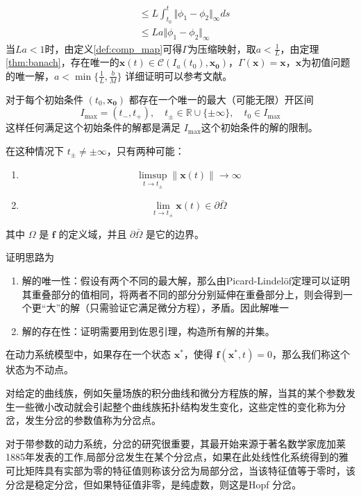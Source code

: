 \begin{pf}
\begin{equation*}
\begin{aligned}
                                                             & \leq L\int_{t_0}^t\Vert \phi_1-\phi_2\Vert_{\infty} ds                             \\
                                                             & \leq La\Vert \phi_1-\phi_2\Vert_{\infty}
        \end{aligned}
    \end{equation*}
    当$La<1$时，由定义\ref{def:comp_map}可得$\Gamma$为压缩映射，取$a<\frac{1}{L}$，由定理\ref{thm:banach}，存在唯一的$\mathbf{x}(t)\in \mathcal{C}(I_a(t_0),\mathbf{x_0})$，$\Gamma(\mathbf{x})=\mathbf{x}$，$\mathbf{x}$为初值问题的唯一解，$a<\min\{\frac{1}{L},\frac{b}{M}\}$
    详细证明可以参考文献\cite{murray2013existence}。
\end{pf}
\begin{rem}\label{rem:P-L}
    对于每个初始条件 $(t_0, \mathbf{x_0})$ 都存在一个唯一的最大（可能无限）开区间
    $$I_{\text{max}} = (t_{-}, t_{+}), \quad t_{\pm} \in \mathbb{R} \cup \{\pm \infty\}, \quad t_0 \in I_{\text{max}}$$
    这样任何满足这个初始条件的解都是满足 $I_{\text{max}}$这个初始条件的解的限制。

    在这种情况下 $t_{\pm} \neq \pm \infty$，只有两种可能：
    \begin{enumerate}
        \item $$\limsup_{t \to t_{\pm}} \|\mathbf{x}(t)\| \to \infty$$
        \item $$\lim_{t \to t_{\pm}} \mathbf{x}(t) \in \partial \bar{\Omega}$$
    \end{enumerate}
    其中 $\Omega$ 是 $\mathbf{f}$ 的定义域，并且 $\partial \bar{\Omega}$ 是它的边界。
\end{rem}
\begin{pf}
    证明思路为\begin{enumerate}
        \item 解的唯一性：假设有两个不同的最大解，那么由Picard-Lindelöf定理可以证明其重叠部分的值相同，将两者不同的部分分别延伸在重叠部分上，则会得到一个更“大”的解（只需验证它满足微分方程），矛盾。因此解唯一
        \item 解的存在性：证明需要用到佐恩引理，构造所有解的并集。
    \end{enumerate}
\end{pf}

\begin{defn}[不动点]
    在动力系统模型中，如果存在一个状态 $\mathbf{x}^*$，使得 $\mathbf{f}(\mathbf{x}^*, t) = 0$，那么我们称这个状态为不动点。
\end{defn}
\begin{defn}[分岔]
    对给定的曲线族，例如矢量场族的积分曲线和微分方程族的解，当其的某个参数发生一些微小改动就会引起整个曲线族拓扑结构发生变化，这些定性的变化称为分岔，发生分岔的参数值称为分岔点。
\end{defn}
对于带参数的动力系统，分岔的研究很重要，其最开始来源于著名数学家庞加莱1885年发表的工作,局部分岔发生在某个分岔点，如果在此处线性化系统得到的雅可比矩阵具有实部为零的特征值则称该分岔为局部分岔，当该特征值等于零时，该分岔是稳定分岔，但如果特征值非零，是纯虚数，则这是Hopf 分岔\cite{enwiki:1216903952}。

